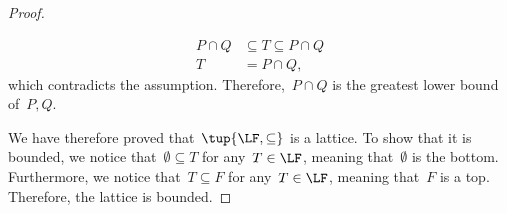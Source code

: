 \begin{proof}
\begin{itemize}
\begin{equation}
\begin{aligned}
                P\cap Q &\subseteq T\subseteq P\cap Q\\
                T&=P\cap Q,
            \end{aligned}
        \end{equation}
        which contradicts the assumption. Therefore,~$P\cap Q$ is the greatest lower bound of~$P,Q$.
    \end{itemize}
    We have therefore proved that~$\tup{\LF,\subseteq}$ is a lattice. To show that it is bounded, we notice that~$\emptyset \subseteq T$ for any~$T\in \LF$, meaning that~$\emptyset$ is the bottom. Furthermore, we notice that~$T\subseteq F$ for any~$T\in \LF$, meaning that~$F$ is a top. Therefore, the lattice is bounded.
\end{proof}

